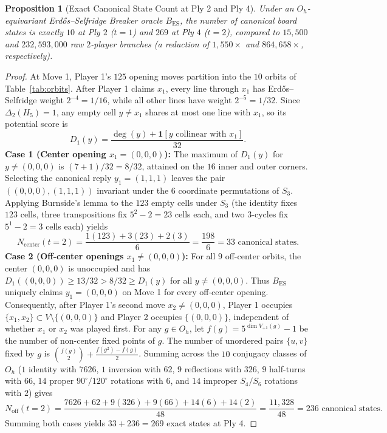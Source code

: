 \documentclass[11pt,a4paper]{article}
\newtheorem{proposition}[theorem]{Proposition}
\theoremstyle{definition}
\theoremstyle{remark}
\begin{document}
\begin{proposition}[Exact Canonical State Count at Ply 2 and Ply 4]
\label{prop:burnside}
Under an $O_h$-equivariant Erd\H{o}s--Selfridge Breaker oracle $B_{\mathrm{ES}}$, the number of canonical board states is exactly $10$ at Ply $2$ ($t=1$) and $269$ at Ply $4$ ($t=2$), compared to $15,500$ and $232,593,000$ raw $2$-player branches (a reduction of $1,550\times$ and $864,658\times$, respectively).
\end{proposition}
\begin{proof}
At Move 1, Player 1's $125$ opening moves partition into the $10$ orbits of Table~\ref{tab:orbits}. After Player 1 claims $x_1$, every line through $x_1$ has Erd\H{o}s--Selfridge weight $2^{-4} = 1/16$, while all other lines have weight $2^{-5} = 1/32$. Since $\Delta_2(H_5) = 1$, any empty cell $y \neq x_1$ shares at most one line with $x_1$, so its potential score is
\begin{equation}
    D_1(y) = \frac{\deg(y) + \mathbf{1}[y \text{ collinear with } x_1]}{32}.
\end{equation}
\textbf{Case 1 (Center opening $x_1 = (0,0,0)$):} The maximum of $D_1(y)$ for $y \neq (0,0,0)$ is $(7+1)/32 = 8/32$, attained on the $16$ inner and outer corners. Selecting the canonical reply $y_1 = (1,1,1)$ leaves the pair $((0,0,0), (1,1,1))$ invariant under the $6$ coordinate permutations of $S_3$. Applying Burnside's lemma to the $123$ empty cells under $S_3$ (the identity fixes $123$ cells, three transpositions fix $5^2 - 2 = 23$ cells each, and two $3$-cycles fix $5^1 - 2 = 3$ cells each) yields
\begin{equation}
    N_{\mathrm{center}}(t=2) = \frac{1(123) + 3(23) + 2(3)}{6} = \frac{198}{6} = 33 \text{ canonical states.}
\end{equation}
\textbf{Case 2 (Off-center openings $x_1 \neq (0,0,0)$):} For all $9$ off-center orbits, the center $(0,0,0)$ is unoccupied and has $D_1((0,0,0)) \ge 13/32 > 8/32 \ge D_1(y)$ for all $y \neq (0,0,0)$. Thus $B_{\mathrm{ES}}$ uniquely claims $y_1 = (0,0,0)$ on Move 1 for every off-center opening. Consequently, after Player 1's second move $x_2 \neq (0,0,0)$, Player 1 occupies $\{x_1, x_2\} \subset V \setminus \{(0,0,0)\}$ and Player 2 occupies $\{(0,0,0)\}$, independent of whether $x_1$ or $x_2$ was played first. For any $g \in O_h$, let $f(g) = 5^{\dim V_{+1}(g)} - 1$ be the number of non-center fixed points of $g$. The number of unordered pairs $\{u,v\}$ fixed by $g$ is $\binom{f(g)}{2} + \frac{f(g^2) - f(g)}{2}$. Summing across the $10$ conjugacy classes of $O_h$ ($1$ identity with $7626$, $1$ inversion with $62$, $9$ reflections with $326$, $9$ half-turns with $66$, $14$ proper $90^\circ/120^\circ$ rotations with $6$, and $14$ improper $S_4/S_6$ rotations with $2$) gives
\begin{equation}
    N_{\mathrm{off}}(t=2) = \frac{7626 + 62 + 9(326) + 9(66) + 14(6) + 14(2)}{48} = \frac{11,328}{48} = 236 \text{ canonical states.}
\end{equation}
Summing both cases yields $33 + 236 = 269$ exact states at Ply 4.
\end{proof}
\end{document}
